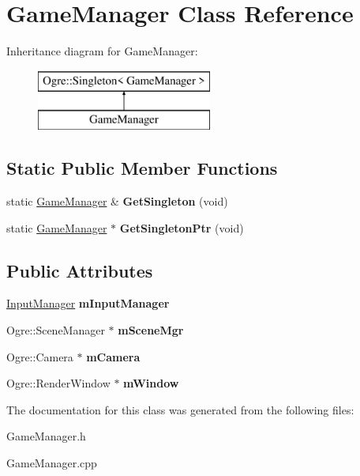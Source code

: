 \hypertarget{class_game_manager}{}\section{Game\+Manager Class Reference}
\label{class_game_manager}
Inheritance diagram for Game\+Manager\+:\begin{figure}[H]
\begin{center}
\leavevmode
\includegraphics[height=2.000000cm]{class_game_manager}
\end{center}
\end{figure}
\subsection*{Static Public Member Functions}
\begin{DoxyCompactItemize}
\item 
\hypertarget{class_game_manager_ac55569b638688eae03c8af064a8f06af}{}static \hyperlink{class_game_manager}{Game\+Manager} \& {\bfseries Get\+Singleton} (void)\label{class_game_manager_ac55569b638688eae03c8af064a8f06af}

\item 
\hypertarget{class_game_manager_a75fe0d91afd004bbbd756a53e41add6f}{}static \hyperlink{class_game_manager}{Game\+Manager} $\ast$ {\bfseries Get\+Singleton\+Ptr} (void)\label{class_game_manager_a75fe0d91afd004bbbd756a53e41add6f}

\end{DoxyCompactItemize}
\subsection*{Public Attributes}
\begin{DoxyCompactItemize}
\item 
\hypertarget{class_game_manager_aed58f2ba9c6c6c5240095fe46698d74f}{}\hyperlink{class_input_manager}{Input\+Manager} {\bfseries m\+Input\+Manager}\label{class_game_manager_aed58f2ba9c6c6c5240095fe46698d74f}

\item 
\hypertarget{class_game_manager_a1c97a0a80e562b5c540ae63337e18810}{}Ogre\+::\+Scene\+Manager $\ast$ {\bfseries m\+Scene\+Mgr}\label{class_game_manager_a1c97a0a80e562b5c540ae63337e18810}

\item 
\hypertarget{class_game_manager_a39aace8d193db09a2137cb66b349f59b}{}Ogre\+::\+Camera $\ast$ {\bfseries m\+Camera}\label{class_game_manager_a39aace8d193db09a2137cb66b349f59b}

\item 
\hypertarget{class_game_manager_a2f1345f20f499d9ac8b1b86422922e72}{}Ogre\+::\+Render\+Window $\ast$ {\bfseries m\+Window}\label{class_game_manager_a2f1345f20f499d9ac8b1b86422922e72}

\end{DoxyCompactItemize}


The documentation for this class was generated from the following files\+:\begin{DoxyCompactItemize}
\item 
Game\+Manager.\+h\item 
Game\+Manager.\+cpp\end{DoxyCompactItemize}
